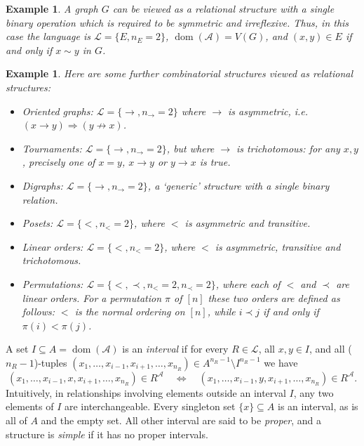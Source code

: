 \documentclass[11pt]{article}
\newtheorem{example}[theorem]{Example}
\begin{document}
\begin{example}
A graph $G$ can be viewed as a relational structure
with a single binary operation which is required to be symmetric and irreflexive.
Thus, in this case the language is  $\mathcal{L} = \{E, n_E=2\}$,
${\operatorname{dom}}(\mathcal{A}) = V(G)$, and $(x,y) \in E$ if and only if $x\sim
y$ in $G$.
\end{example}

\begin{example}
Here are some further combinatorial structures viewed as relational structures:
\begin{itemize}
\item[(i)]
Oriented graphs: $\mathcal{L}=\{\rightarrow,n_\rightarrow=2\}$ where $\rightarrow$ is asymmetric,
i.e. $(x\rightarrow y) \Rightarrow (y\not\rightarrow x)$.
\item[(ii)]
Tournaments: $\mathcal{L}=\{\rightarrow,n_\rightarrow=2\}$, but where $\rightarrow$ is trichotomous:
for any $x,y$, precisely one of $x=y$, $x\rightarrow y$ or $y\rightarrow x$ is true.
\item[(iii)]
Digraphs: $\mathcal{L}=\{\rightarrow,n_\rightarrow=2\}$, a `generic' structure with a single binary relation.
\item[(iv)]
Posets: $\mathcal{L}=\{<,n_<=2\}$, where $<$ is asymmetric and transitive.
\item[(v)]
Linear orders:  $\mathcal{L}=\{<,n_<=2\}$, where $<$ is asymmetric, transitive and trichotomous.
\item[(vi)]
Permutations: $\mathcal{L} = \{<,\prec,n_<=2,n_\prec=2\}$, where each of $<$ and $\prec$ are linear orders.
For a permutation $\pi$ of $[n]$ these two orders are defined as follows:
$<$ is the normal ordering on $[n]$, while $i\prec j$ if and only if $\pi(i) < \pi(j)$.
\end{itemize}
\end{example}

A set $I\subseteq A={\operatorname{dom}}(\mathcal{A})$ is an \emph{interval} if
for every $R\in\mathcal{L}$, all $x,y\in I$, and all ($n_R-1$)-tuples
$(x_1,\ldots,x_{i-1},x_{i+1},\ldots,x_{n_R})\in A^{n_R-1}\setminus I^{n_R-1}$ we have
\begin{displaymath}
(x_1,\ldots,x_{i-1},x,x_{i+1},\ldots,x_{n_R})\in R^\mathcal{A} \quad \Longleftrightarrow \quad
(x_1,\ldots,x_{i-1},y,x_{i+1},\ldots,x_{n_R})\in R^\mathcal{A}.
\end{displaymath}
Intuitively, in relationships involving elements outside an interval $I$, any two elements of $I$ are interchangeable.
Every singleton set $\{x\}\subseteq A$ is an interval, as is all of $A$ and the empty set.  All other interval are said to be \emph{proper}, and a structure is \emph{simple} if it has no proper intervals.
\end{document}
